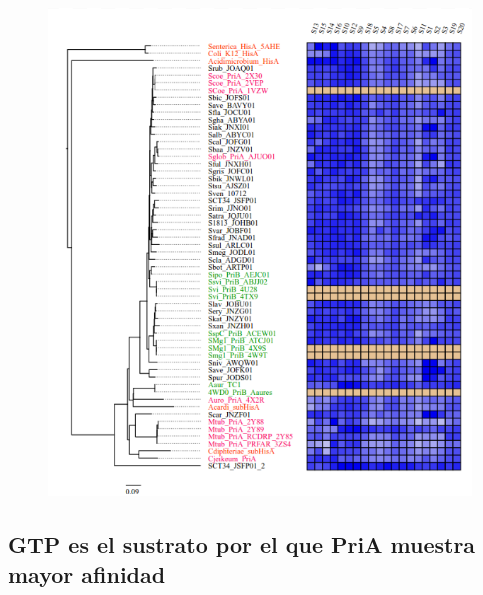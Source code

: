 \documentclass[12pt,twoside]{reedthesis}
\begin{document}
  \begin{figure}[h!tbp]
  \centering
  \includegraphics[angle = 0,scale = 0.6]{chapter4/PriAHeatPot.png}
  \caption[Heat Plot PriA Streptomyces vs other subtrates]{\footnotesize{}}
  \label{fig:PriADocking}
  \end{figure}
  
  \subsection{GTP es el sustrato por el que PriA muestra mayor
  afinidad}\label{gtp-es-el-sustrato-por-el-que-pria-muestra-mayor-afinidad}
  
\end{document}
